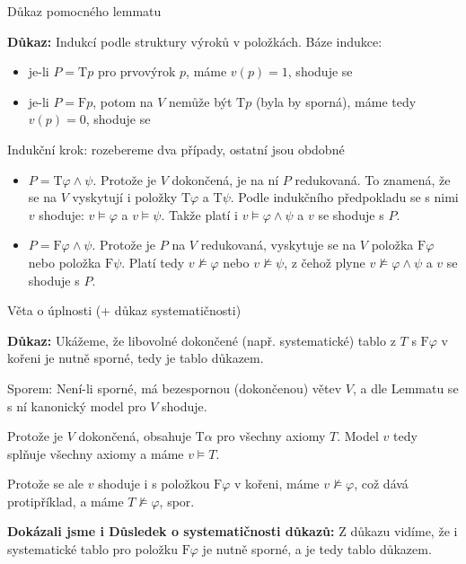 \documentclass{beamer}
\begin{document}
\begin{frame}{Důkaz pomocného lemmatu}

    \textbf{Důkaz:}
    Indukcí podle struktury výroků v položkách. \alert{Báze indukce:} 
    \begin{itemize}
        \item je-li \alert{$P=\mathrm{T}p$} pro prvovýrok $p$, máme $v(p)=1$, shoduje se
        \item je-li \alert{$P=\mathrm{F}p$}, potom na $V$ nemůže být $\mathrm{T}p$ (byla by sporná), máme tedy $v(p)=0$, shoduje se
    \end{itemize}

    \alert{Indukční krok:} rozebereme dva případy, ostatní jsou obdobné

    \begin{itemize}
        \item \alert{$P=\mathrm{T}\varphi\land\psi$}. Protože je $V$ dokončená, je na ní $P$ redukovaná. To znamená, že se na $V$ vyskytují i položky $\mathrm{T}\varphi$ a $\mathrm{T}\psi$. Podle indukčního předpokladu se s nimi $v$ shoduje: $v\models\varphi$ a $v\models\psi$. Takže platí i $v\models\varphi\land\psi$ a $v$ se shoduje s $P$.
    
        \item \alert{$P=\mathrm{F}\varphi\land\psi$}. Protože je $P$ na $V$ redukovaná, vyskytuje se na $V$ položka $\mathrm{F}\varphi$ nebo položka $\mathrm{F}\psi$. Platí tedy $v\not\models\varphi$ nebo $v\not\models\psi$, z čehož plyne $v\not\models\varphi\land\psi$ a $v$ se shoduje s $P$.\hfill\qedsymbol
    \end{itemize}

\end{frame}


\begin{frame}{Věta o úplnosti (+ důkaz systematičnosti)}

    
    \textbf{Důkaz:}
    Ukážeme, že libovolné dokončené (např. \alert{systematické}) tablo z $T$ s $\mathrm{F}\varphi$ v kořeni je nutně sporné, tedy je tablo důkazem. 
    
    Sporem: \alert{Není-li sporné}, má bezespornou (dokončenou) větev $V$, a dle Lemmatu se s ní kanonický model pro $V$ shoduje. 
    
    Protože je $V$ dokončená, obsahuje $\mathrm{T}\alpha$ pro všechny axiomy $T$. Model $v$ tedy splňuje všechny axiomy a máme $v\models T$. 
    
    Protože se ale $v$ shoduje i s položkou $\mathrm{F}\varphi$ v kořeni, máme $v\not\models\varphi$, což dává protipříklad, a máme $T\not\models\varphi$, spor.\hfill\qedsymbol


    \textbf{Dokázali jsme i Důsledek o systematičnosti důkazů:}  Z důkazu vidíme, že i systematické tablo pro položku $\mathrm{F}\varphi$ je nutně sporné, a je tedy tablo důkazem.\hfill\qedsymbol

\end{frame}
\end{document}
